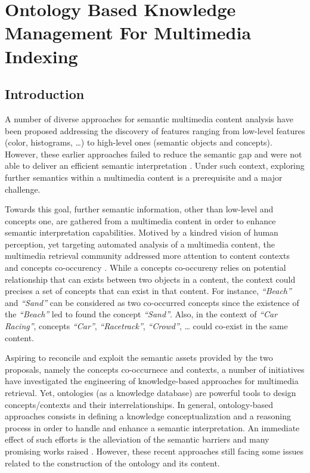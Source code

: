\chapter{Ontology Based Knowledge Management For Multimedia Indexing}


\section{Introduction}

A number of diverse approaches for semantic multimedia content analysis have been proposed addressing the discovery of features ranging from low-level features \cite{Brunelli1999,Antani2002,Kang2003,Smith2003} (color, histograms, \dots{}) to high-level ones \cite{Snoek2006, Lew2006,Spyrou2008} (semantic objects and concepts). However, these earlier approaches failed to reduce the semantic gap and were not able to deliver an efficient semantic interpretation \cite{Snoek2010,Over2013}. Under such context, exploring further semantics within a multimedia content is a prerequisite and a major challenge.

Towards this goal, further semantic information, other than low-level and concepts one, are gathered from a multimedia content in order to enhance semantic interpretation capabilities. Motived by a kindred vision of human perception, yet targeting automated analysis of a multimedia content, the multimedia retrieval community addressed more attention to content contexts \cite{Mylonas2009, Nguyen2010, Elleuch2011,PerpetualCoutinho2012} and concepts co-occurency \cite{Naphade2006,Vallet2007,
Mylonas2008,Mylonas2009,Elleuch2011,Paliouras2011}. While a concepts co-occureny relies on potential relationship that can exists between two objects in a content, the context could precises a set of concepts that can exist in that content. For instance, \emph{``Beach''} and \emph{``Sand''} can be considered as two co-occurred concepts since the existence of the \emph{``Beach''} led to found the concept \emph{``Sand''}. Also, in the context of \emph{``Car Racing''}, concepts \emph{``Car''}, \emph{``Racetrack''}, \emph{``Crowd''}, \dots{} could co-exist in the same content. 

Aspiring to reconcile and exploit the semantic assets provided by the two proposals, namely the concepts co-occurnece and contexts, a number of initiatives have investigated the engineering of knowledge-based approaches for multimedia retrieval. Yet, ontologies (as a knowledge database) are powerful tools to design concepts/contexts and their interrelationships. In general, ontology-based approaches consists in defining a knowledge conceptualization and a reasoning process in order to handle and enhance a semantic interpretation. An immediate effect of such efforts is the alleviation of the semantic barriers and many promising works raised \cite{Kannan2012}. However, these recent approaches still facing some issues related to the construction of the ontology and its content. 

